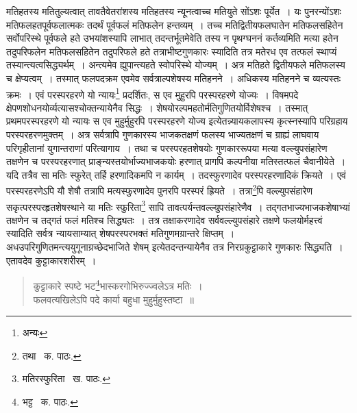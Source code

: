 \documentclass[11pt, openany]{book}
\begin{document}
\noindent मतिहतस्य मतितुल्यत्वात् तावतैवेतरांशस्य मतिहतस्य न्यूनत्वाच्च मतियुते सोंऽशः पूर्येत~। यः पुनरन्योंऽशः मतिफलहतपूर्वफलात्मकः तदर्थं पूर्वफलं मतिफलेन हन्तव्यम्~। तच्च मतिद्वितीयफलघातेन मतिफलसहितेन सर्वोपरिस्थे पूर्वफले हते उभयांशस्यापि लाभात् तदन्तर्भूतमेवेति तस्य न पृथग्घननं कर्तव्यमिति मत्या हतेन तदुपरिफलेन मतिफलसहितेन तदुपरिफले हते तत्राभीष्टगुणकारः स्यादिति तत्र मतेरध एव तत्फलं स्थाप्यं तस्यान्त्यत्वसिद्ध्यर्थम्~। अन्त्यमेव ह्युपान्त्यहते स्वोपरिस्थे योज्यम्~। अत्र मतिहते द्वितीयफले मतिफलस्य च क्षेप्यत्वम्~। तस्मात् फलपदक्रम एवमेव सर्वत्राल्पशेषस्य मतिहनने~। अधिकस्य मतिहनने च व्यत्यस्तः क्रमः~। एवं परस्परहरणे यो न्यायः\renewcommand{\thefootnote}{१}\footnote{अन्यः} प्रदर्शितः, स एव मुहुरपि परस्परहरणे योज्यः~। विषमपदे क्षेपणशोधनयोर्व्यत्यासश्चोक्तन्यायेनैव सिद्धः~। शेषयोरल्पमहतोर्मतिगुणितयोर्विशेषश्च~। तस्मात् प्रथमपरस्परहरणे यो न्यायः स एव मुहुर्मुहुरपि परस्परहरणे योज्य इत्येतन्न्यायकलापस्य कृत्स्नस्यापि परिग्रहाय परस्परहरणमुक्तम्~। अत्र सर्वत्रापि गुणकारस्य भाजकतक्षणं फलस्य भाज्यतक्षणं च ग्राह्यं लाघवाय परिगृहीतानां युगान्तराणां परित्यागाय~। तथा च परस्परहतशेषयोः गुणकाररूपया मत्या वल्ल्युपसंहारेण तक्षणेन च परस्परहरणात् प्राङ्न्यस्तयोर्भाज्यभाजकयोः हरणात् प्रागपि कल्पनीया मतिस्तत्फलं चैवानीयेते~। यदि तत्रैव सा मतिः स्फुरेत् तर्हि हरणादिकमपि न कार्यम्~। तदस्फुरणादेव परस्परहरणादिकं क्रियते~। एवं परस्परहरणेऽपि यौ शेषौ तत्रापि मत्यस्फुरणादेव पुनरपि परस्परं ह्रियते~। तत्रा\renewcommand{\thefootnote}{२}\footnote{तथा \textendash\ क. पाठः.}पि वल्ल्युपसंहारेण सकृत्परस्परहृतशेषस्थाने या मतिः स्फुरिता\renewcommand{\thefootnote}{३}\footnote{मतिरस्फुरिता \textendash\ ख. पाठः.} सापि तावत्पर्यन्तवल्ल्युपसंहारेणैव~। तद्गतभाज्यभाजकशेषाभ्यां तक्षणेन च तद्गतं फलं मतिश्च सिद्ध्यतः~। तत्र तक्षाकरणादेव सर्ववल्ल्युपसंहारे तक्षणे फलयोर्महत्त्वं स्यादिति सर्वत्र न्यायसाम्यात् {\qt शेषपरस्परभक्तं मतिगुणमग्रान्तरे क्षिप्तम्~। अधउपरिगुणितमन्त्ययुगूनाग्रच्छेदभाजिते शेषम्} इत्येतदन्तन्यायेनैव तत्र निरग्रकुट्टाकारे गुणकारः सिद्ध्यति~। एतावदेव कुट्टाकारशरीरम्~।

\begin{quote} 
{\qt कुट्टाकारे स्पष्टे भट\renewcommand{\thefootnote}{४}\footnote{भट्ट \textendash\ क. पाठः.}भास्करगोभिरुज्ज्वलेऽत्र मतिः~।\\
फलवत्यखिलेऽपि पदे कार्या बहुधा मुहुर्मुहुस्तष्टा~॥}
\end{quote}

\newpage
\end{document}
